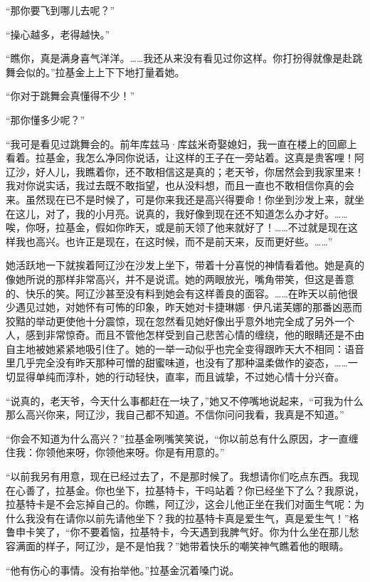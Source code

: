 \par “那你要飞到哪儿去呢？”
\par “操心越多，老得越快。”
\par “瞧你，真是满身喜气洋洋。……我还从来没有看见过你这样。你打扮得就像是赴跳舞会似的。”拉基金上上下下地打量着她。
\par “你对于跳舞会真懂得不少！”
\par “那你懂多少呢？”
\par “我可是看见过跳舞会的。前年库兹马·库兹米奇娶媳妇，我一直在楼上的回廊上看着。拉基金，我怎么净同你说话，让这样的王子在一旁站着。这真是贵客哩！阿辽沙，好人儿，我瞧着你，还不敢相信这是真的；老天爷，你居然会到我家里来！我对你说实话，我过去既不敢指望，也从没料想，而且一直也不敢相信你真的会来。虽然现在已不是时候了，可是你来我还是高兴得要命！你坐到沙发上来，就坐在这儿，对了，我的小月亮。说真的，我好像到现在还不知道怎么办才好。……唉，你呀，拉基金，假如你昨天，或是前天领了他来就好了！……不过就是现在这样我也高兴。也许正是现在，在这时候，而不是前天来，反而更好些。……”
\par 她活跃地一下就挨着阿辽沙在沙发上坐下，带着十分喜悦的神情看着他。她是真的像她所说的那样非常高兴，并不是说谎。她的两眼放光，嘴角带笑，但这是善意的、快乐的笑。阿辽沙甚至没有料到她会有这样善良的面容。……在昨天以前他很少遇见过她，对她怀有可怖的印象，昨天她对卡捷琳娜·伊凡诺芙娜的那番凶恶而狡黠的举动更使他十分震惊，现在忽然看见她好像出乎意外地完全成了另外一个人，感到非常惊奇。而且不管他怎样受到自己悲苦心情的缠绕，他的眼睛还是不由自主地被她紧紧地吸引住了。她的一举一动似乎也完全变得跟昨天大不相同：语音里几乎完全没有昨天那种可憎的甜蜜味道，也没有了那种温柔做作的姿态，……一切显得单纯而淳朴，她的行动轻快，直率，而且诚挚，不过她心情十分兴奋。
\par “说真的，老天爷，今天什么事都赶在一块了，”她又不停嘴地说起来，“可我为什么那么高兴你来，阿辽沙，我自己都不知道。不信你问问我看，我真是不知道。”
\par “你会不知道为什么高兴？”拉基金咧嘴笑笑说，“你以前总有什么原因，才一直缠住我：你领他来呀，你领他来呀。你是有用意的。”
\par “以前我另有用意，现在已经过去了，不是那时候了。我想请你们吃点东西。我现在心善了，拉基金。你也坐下，拉基特卡，干吗站着？你已经坐下了么？我原说，拉基特卡是不会忘掉自己的。你瞧，阿辽沙，这会儿他正坐在我们对面生气呢：为什么我没有在请你以前先请他坐下？我的拉基特卡真是爱生气，真是爱生气！”格鲁申卡笑了，“你不要着恼，拉基特卡，今天遇到我脾气好。你为什么坐在那儿愁容满面的样子，阿辽沙，是不是怕我？”她带着快乐的嘲笑神气瞧着他的眼睛。
\par “他有伤心的事情。没有抬举他。”拉基金沉着嗓门说。

